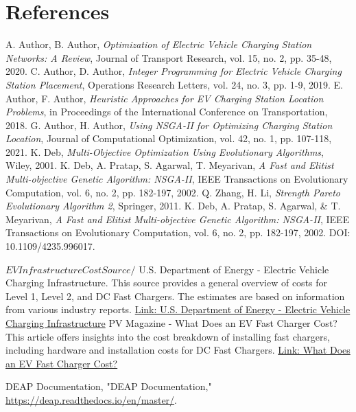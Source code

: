 \documentclass[12pt]{report}
\begin{document}
\chapter{References}
\begin{thebibliography}{99}
     A. Author, B. Author, \textit{Optimization of Electric Vehicle Charging Station Networks: A Review}, Journal of Transport Research, vol. 15, no. 2, pp. 35-48, 2020.
     C. Author, D. Author, \textit{Integer Programming for Electric Vehicle Charging Station Placement}, Operations Research Letters, vol. 24, no. 3, pp. 1-9, 2019.
     E. Author, F. Author, \textit{Heuristic Approaches for EV Charging Station Location Problems}, in Proceedings of the International Conference on Transportation, 2018.
     G. Author, H. Author, \textit{Using NSGA-II for Optimizing Charging Station Location}, Journal of Computational Optimization, vol. 42, no. 1, pp. 107-118, 2021.
     K. Deb, \textit{Multi-Objective Optimization Using Evolutionary Algorithms}, Wiley, 2001.
     K. Deb, A. Pratap, S. Agarwal, T. Meyarivan, \textit{A Fast and Elitist Multi-objective Genetic Algorithm: NSGA-II}, IEEE Transactions on Evolutionary Computation, vol. 6, no. 2, pp. 182-197, 2002.
     Q. Zhang, H. Li, \textit{Strength Pareto Evolutionary Algorithm 2}, Springer, 2011.
     K. Deb, A. Pratap, S. Agarwal, \& T. Meyarivan, \textit{A Fast and Elitist Multi-objective Genetic Algorithm: NSGA-II}, IEEE Transactions on Evolutionary Computation, vol. 6, no. 2, pp. 182-197, 2002. DOI: 10.1109/4235.996017.

    $
    EV Infrastructure Cost Source 
    /$
     U.S. Department of Energy - Electric Vehicle Charging Infrastructure. This source provides a general overview of costs for Level 1, Level 2, and DC Fast Chargers. The estimates are based on information from various industry reports. \href{https://www.energy.gov/eere/vehicles/ev-charging-infrastructure}{Link: U.S. Department of Energy - Electric Vehicle Charging Infrastructure}
     PV Magazine - What Does an EV Fast Charger Cost? This article offers insights into the cost breakdown of installing fast chargers, including hardware and installation costs for DC Fast Chargers. \href{https://www.pv-magazine.com/2021/10/18/what-does-an-ev-fast-charger-cost/}{Link: What Does an EV Fast Charger Cost?}

     DEAP Documentation, "DEAP Documentation," \url{https://deap.readthedocs.io/en/master/}.
    

\end{thebibliography}
\end{document}
